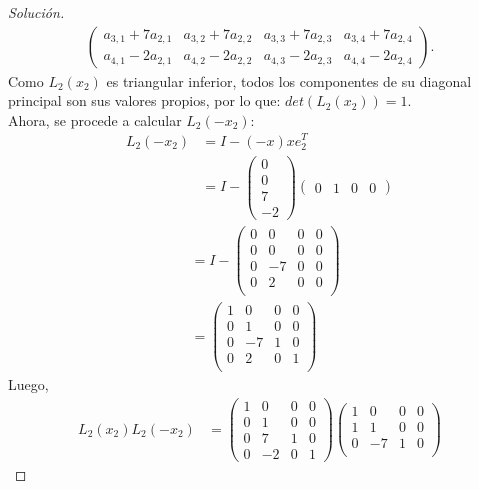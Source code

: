 \documentclass[12pt]{book}
\newenvironment{solucion}
  {\renewcommand\qedsymbol{$\square$}\begin{proof}[Solución]}
  {\end{proof}}
\begin{document}
\begin{solucion}
\begin{align*}
\begin{pmatrix}
    a_{3,1}+7a_{2,1} & a_{3,2}+7a_{2,2} & a_{3,3}+7a_{2,3} & a_{3,4}+7a_{2,4}\\
    a_{4,1}-2a_{2,1} & a_{4,2}-2a_{2,2} & a_{4,3}-2a_{2,3} & a_{4,4}-2a_{2,4}
    \end{pmatrix}.
\end{align*}
Como $L_2(x_2)$ es triangular inferior, todos los componentes de su diagonal principal son sus valores propios, por lo que: $det\left(L_2(x_2)\right)=1$.\\
Ahora, se procede a calcular $L_2(-x_2)$:
\begin{align*}
    L_2(-x_2)&=I-(-x)xe_2^T\\[8pt]
    &=I-\begin{pmatrix}
    0\\
    0\\
    7\\
    -2
    \end{pmatrix}\begin{pmatrix}
    0 & 1 & 0 & 0
    \end{pmatrix}
\end{align*}
\begin{align*}
    &= I-\begin{pmatrix}
    0 & 0 & 0 & 0\\
    0 & 0 & 0 & 0\\
    0 & -7 & 0 & 0\\
    0 & 2 & 0 & 0\\
    \end{pmatrix}\\[8pt]
    &=\begin{pmatrix}
    1 & 0 & 0 & 0\\
    0 & 1 & 0 & 0\\
    0 & -7 & 1 & 0\\
    0 & 2 & 0 & 1\\
    \end{pmatrix}
\end{align*}
Luego,
\begin{align*}
    L_2(x_2)L_2(-x_2)&=\begin{pmatrix}
    1 & 0 & 0 & 0\\
    0 & 1 & 0 & 0\\
    0 & 7 & 1 & 0\\
    0 & -2 & 0 & 1
    \end{pmatrix}\begin{pmatrix}
    1 & 0 & 0 & 0\\
    1 & 1 & 0 & 0\\
    0 & -7 & 1 & 0\\

\end{pmatrix}
\end{align*}
\end{solucion}
\end{document}
